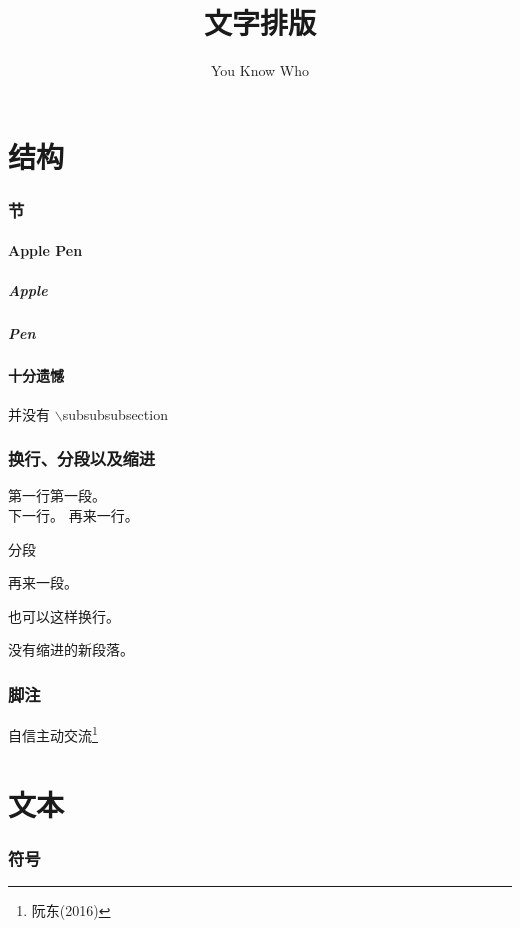 \documentclass[12pt]{article}
\author{You Know Who}
\title{文字排版}
\begin{document}
\maketitle
\newpage

\tableofcontents
\newpage

\part{结构}
\section{节}
\subsection{Apple Pen}
\subsubsection{Apple}
\subsubsection{Pen}
\subsection*{十分遗憾}
并没有 $\backslash$subsubsubsection

\section{换行、分段以及缩进}
第一行第一段。\\
下一行。\newline
\indent 再来一行。

分段\par
再来一段。

也可以这样换行。

\vspace{1em}

\noindent 没有缩进的新段落。

\section{脚注}
自信主动交流\footnote{阮东(2016)}

\part{文本}
\section{符号}\label{sec1}
\end{document}
